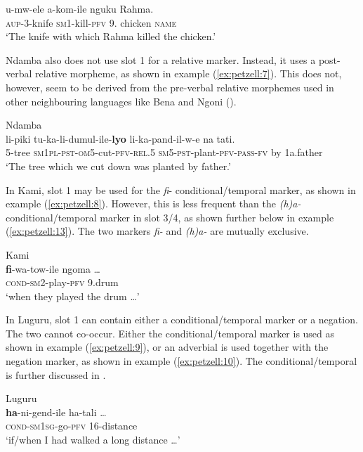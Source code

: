 \documentclass[output=paper,
            colorlinks, citecolor=brown
            ,draftmode
		  ]{langscibook}
\begin{document}
\ex\label{ex:petzell:6} 
\gll u-mw-ele     a-kom-ile       nguku     Rahma.\\
\textsc{aup}{}-3-knife  \textsc{sm1}{}-kill-\textsc{pfv}       9. chicken  \textsc{{name}}\\
\glt `The knife with which Rahma killed the chicken.'
\z


Ndamba also does not use slot 1 for a relative marker. Instead, it uses a post-verbal relative morpheme, as shown in example (\ref{ex:petzell:7}). This does not, however, seem to be derived from the pre-verbal relative morphemes used in other neighbouring languages like Bena and Ngoni (\citealt{Morrison2011, Ngonyani2003}).


\ea\label{ex:petzell:7}Ndamba\\
\gll li-piki  tu-ka-li-dumul-ile-\textbf{lyo}        li-ka-pand-il-w-e        na    tati.\\
\textsc{5-}{tree} \textsc{sm1pl-pst-om5-}{cut}\textsc{{}-pfv-{rel.5}}  \textsc{sm5-pst-}{plant}\textsc{{}-pfv-pass-fv} by    1a.father\\
\glt `The tree which we cut down was planted by father.'
\z


\begin{sloppypar}
In Kami, slot 1 may be used for the \textit{fi}{}- conditional/temporal marker, as shown in example (\ref{ex:petzell:8}). However, this is less frequent than the \textit{(h)a-} conditional\slash temporal marker in slot 3/4, as shown further below in example (\ref{ex:petzell:13}). The two markers \textit{fi-} and \textit{(h)a-} are mutually exclusive.
\end{sloppypar}

\ea\label{ex:petzell:8} Kami\\
\gll \textbf{fi}{}-wa-tow-ile      ngoma \ldots\\
\textsc{cond{}-sm}2-play-\textsc{pfv}  9.drum\\
\glt `when they played the drum \ldots'
\z



In Luguru, slot 1 can contain either a conditional/temporal marker or a negation. The two cannot co-occur. Either the conditional/temporal marker is used as shown in example (\ref{ex:petzell:9}), or an adverbial is used together with the negation marker, as shown in example (\ref{ex:petzell:10}). The conditional/temporal is further discussed in .


\ea\label{ex:petzell:9} Luguru\\
\gll \textbf{ha}{}-ni-gend-ile       ha-tali \ldots \\
\textsc{cond}{}-\textsc{sm}1\textsc{sg}{}-go-\textsc{pfv} 16-distance\\
\glt `if/when I had walked a long distance \ldots'
\end{document}
